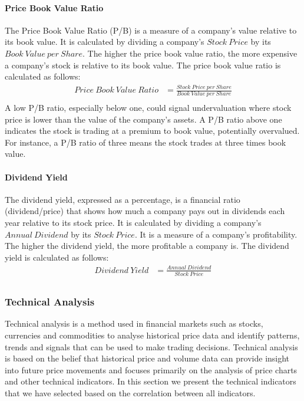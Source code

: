 \documentclass[../xlapes02]{subfiles}
\begin{document}
    \paragraph{Price Book Value Ratio}\label{par:price-book-value-ratio}
    The Price Book Value Ratio (P/B) is a measure of a company's value relative to its book value. It is calculated by dividing a company's $Stock\ Price$ by its $Book\ Value\ per\ Share$. The higher the price book value ratio, the more expensive a company's stock is relative to its book value. The price book value ratio is calculated as follows:
    \begin{equation}
        \begin{split}
            Price\ Book\ Value\ Ratio&=\frac{Stock\ Price\ per\ Share}{Book\ Value\ per\ Share}\\
        \end{split}
    \end{equation}
    A low P/B ratio, especially below one, could signal undervaluation where stock price is lower than the value of the company's assets. A P/B ratio above one indicates the stock is trading at a premium to book value, potentially overvalued. For instance, a P/B ratio of three means the stock trades at three times book value.

    \paragraph{Dividend Yield}\label{par:dividend-yield}
    The dividend yield, expressed as a percentage, is a financial ratio (dividend/price) that shows how much a company pays out in dividends each year relative to its stock price. It is calculated by dividing a company's $Annual\ Dividend$ by its $Stock\ Price$. It is a measure of a company's profitability. The higher the dividend yield, the more profitable a company is. The dividend yield is calculated as follows:
    \begin{equation}
        \begin{split}
            Dividend\ Yield&=\frac{Annual\ Dividend}{Stock\ Price}\\
        \end{split}
    \end{equation}

    \subsubsection{Technical Analysis}\label{subsubsec:technical-analysis}
    Technical analysis is a method used in financial markets such as stocks, currencies and commodities to analyse historical price data and identify patterns, trends and signals that can be used to make trading decisions. Technical analysis is based on the belief that historical price and volume data can provide insight into future price movements and focuses primarily on the analysis of price charts and other technical indicators. In this section we present the technical indicators that we have selected based on the correlation between all indicators.
\end{document}
